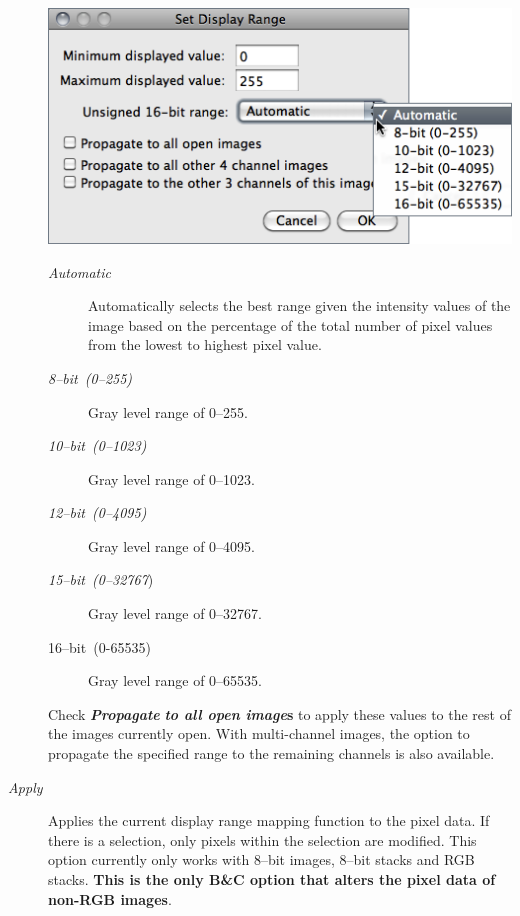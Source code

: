 \begin{description}
\noindent \begin{center}
\includegraphics[scale=0.55]{images/SetDisplayRange}
\par\end{center}
\begin{description}
\item [{\emph{Automatic}}] Automatically selects the best range given the
intensity values of the image based on the percentage of the total
number of pixel values from the lowest to highest pixel value. 
\item [{\emph{8--bit\ (0--255)}}] Gray level range of 0--255. 
\item [{\emph{10--bit\ (0--1023)}}] Gray level range of 0--1023.
\item [{\emph{12--bit\ (0--4095)}}] Gray level range of 0--4095.
\item [{\emph{15--bit\ (0--32767})}] Gray level range of 0--32767.
\item [{16--bit\emph{\ }(0-65535)}] Gray level range of 0--65535.
\end{description}

\improvement{}Check \textbf{\emph{Propagate}}\textbf{ }\textbf{\emph{to
all open image}}\textbf{s} to apply these values to the rest of the
images currently open. With multi-channel images, the option to propagate
the specified range to the remaining channels is also available.

\item [{\emph{Apply}}] Applies the current display range mapping function
to the pixel data. If there is a selection, only pixels within the
selection are modified. This option currently only works with 8--bit
images, 8--bit stacks and RGB stacks. \textbf{This is the only B\&C
option that alters the pixel data of non-RGB images}.
\end{description}


